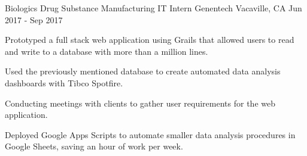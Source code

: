 

\begin{cventries}

  \cventry
    {Biologics Drug Substance Manufacturing IT Intern} %
    {Genentech} %
    {Vacaville, CA} %
    {Jun 2017 - Sep 2017} %
    {
      \begin{cvitems} %
        \item {Prototyped a full stack web application using Grails that allowed users to read and write to a database with more than a million lines.}
        \item {Used the previously mentioned database to create automated data analysis dashboards with Tibco Spotfire.}
        \item {Conducting meetings with clients to gather user requirements for the web application.}
        \item {Deployed Google Apps Scripts to automate smaller data analysis procedures in Google Sheets, saving an hour of work per week.}
      \end{cvitems}
    }
\end{cventries}
